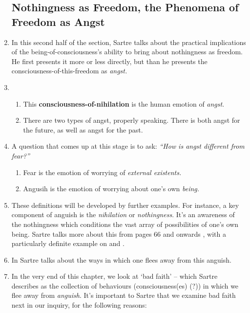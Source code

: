 \begin{enumerate}
  \subsection*{Nothingness as Freedom, the Phenomena of Freedom as Angst}
  \item In this second half of the section, Sartre talks about the practical implications of the being-of-consciousness's ability to bring about nothingness as freedom. He first presents it more or less directly, but than he presents the consciousness-of-this-freedom as \emph{angst.}
  \item {}
  \begin{enumerate}
    \item This \textbf{consciousness-of-nihilation} is the human emotion of \emph{angst}.
    \item There are two types of angst, properly speaking. There is both angst for the future, as well as angst for the past.
  \end{enumerate}
  \item A question that comes up at this stage is to ask: \emph{\enquote{How is angst different from \emph{fear}?}}
  \begin{enumerate}
    \item Fear is the emotion of worrying of \emph{external existents.}
    \item Angusih is the emotion of worrying about one's own \emph{being.}
  \end{enumerate}
  \item These definitions will be developed by further examples. For instance, a key component of anguish is the \emph{nihilation} or \emph{nothingness}. It's an awareness of the nothingness which conditions the vast array of possibilities of one's own being. Sartre talks more about this from pages 66 and onwards \autocite[66]{sartre}, with a particularly definite example on \autocite[71]{sartre} and \autocite[77]{sartre}.
  \item In \autocite[80]{sartre} Sartre talks about the ways in which one flees away from this anguish.
  \item In the very end of this chapter, we look at \enquote*{bad faith} -- which Sartre describes as the collection of behaviours (consciousness(es) (?)) in which we flee away from \emph{anguish}. It's important to Sartre that we examine bad faith next in our inquiry, for the following reasons:

\end{enumerate}
